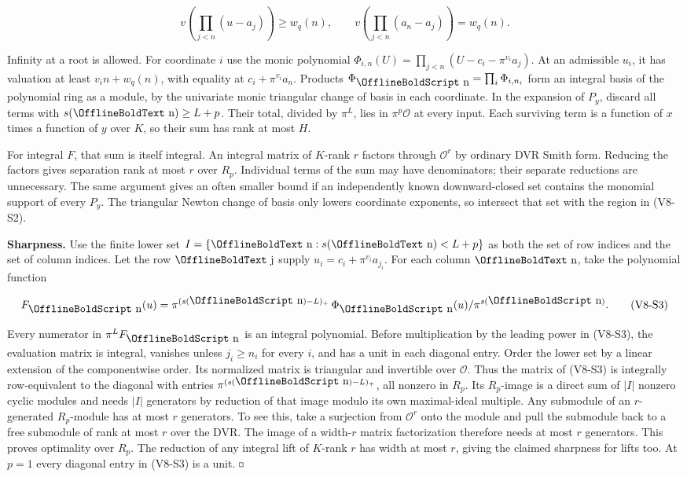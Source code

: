 \documentclass[11pt,a4paper]{article}
\renewcommand{\square}{\mathord{\vcenter{\hbox{\fboxsep=0pt\fboxrule=.4pt\fbox{\rule{0pt}{.7ex}\rule{.7ex}{0pt}}}}}}
\renewcommand{\boldsymbol}[1]{\mathord{\mathchoice
  {\hbox{\OfflineBoldText #1}}{\hbox{\OfflineBoldText #1}}
  {\hbox{\OfflineBoldScript #1}}{\hbox{\OfflineBoldScriptScript #1}}}}
\begin{document}
\[
 v\!\left(\prod_{j<n}(u-a_j)\right)\ge w_q(n),\qquad
 v\!\left(\prod_{j<n}(a_n-a_j)\right)=w_q(n).
\]

Infinity at a root is allowed. For coordinate \(i\) use the monic
polynomial \(\Phi_{i,n}(U)=\prod_{j<n}(U-c_i-\pi^{v_i}a_j)\). At an
admissible \(u_i\), it has valuation at least \(v_i n+w_q(n)\), with
equality at \(c_i+\pi^{v_i}a_n\). Products
\(\Phi_{\boldsymbol n}=\prod_i\Phi_{i,n_i}\) form an integral basis of
the polynomial ring as a module, by the univariate monic triangular
change of basis in each coordinate. In the expansion of \(P_y\), discard
all terms with \(s(\boldsymbol n)\ge L+p\). Their total, divided by
\(\pi^L\), lies in \(\pi^p\mathcal O\) at every input. Each surviving
term is a function of \(x\) times a function of \(y\) over \(K\), so
their sum has rank at most \(H\).

For integral \(F\), that sum is itself integral. An integral matrix of
\(K\)-rank \(r\) factors through \(\mathcal O^r\) by ordinary DVR Smith
form. Reducing the factors gives separation rank at most \(r\) over
\(R_p\). Individual terms of the sum may have denominators; their
separate reductions are unnecessary. The same argument gives an often
smaller bound if an independently known downward-closed set contains the
monomial support of every \(P_y\). The triangular Newton change of basis
only lowers coordinate exponents, so intersect that set with the region
in (V8-S2).

\textbf{Sharpness.} Use the finite lower set
\(I=\{\boldsymbol n:s(\boldsymbol n)<L+p\}\) as both the set of row
indices and the set of column indices. Let the row \(\boldsymbol j\)
supply \(u_i=c_i+\pi^{v_i}a_{j_i}\). For each column \(\boldsymbol n\),
take the polynomial function

\[
 F_{\boldsymbol n}(u)
 =\pi^{(s(\boldsymbol n)-L)_+}\,
                \Phi_{\boldsymbol n}(u)/\pi^{s(\boldsymbol n)}.
                                                                    \tag{V8-S3}
\]

Every numerator in \(\pi^L F_{\boldsymbol n}\) is an integral
polynomial. Before multiplication by the leading power in (V8-S3), the
evaluation matrix is integral, vanishes unless \(j_i\ge n_i\) for every
\(i\), and has a unit in each diagonal entry. Order the lower set by a
linear extension of the componentwise order. Its normalized matrix is
triangular and invertible over \(\mathcal O\). Thus the matrix of (V8-S3)
is integrally row-equivalent to the diagonal with entries
\(\pi^{(s(\boldsymbol n)-L)_+}\), all nonzero in \(R_p\). Its
\(R_p\)-image is a direct sum of \(|I|\) nonzero cyclic modules and
needs \(|I|\) generators by reduction of that image modulo its own
maximal-ideal multiple. Any submodule of an \(r\)-generated
\(R_p\)-module has at most \(r\) generators. To see this, take a
surjection from \(\mathcal O^r\) onto the module and pull the submodule
back to a free submodule of rank at most \(r\) over the DVR. The image
of a width-\(r\) matrix factorization therefore needs at most \(r\)
generators. This proves optimality over \(R_p\). The reduction of any
integral lift of \(K\)-rank \(r\) has width at most \(r\), giving the
claimed sharpness for lifts too. At \(p=1\) every diagonal entry in (V8-S3)
is a unit. \(\square\)
\end{document}
